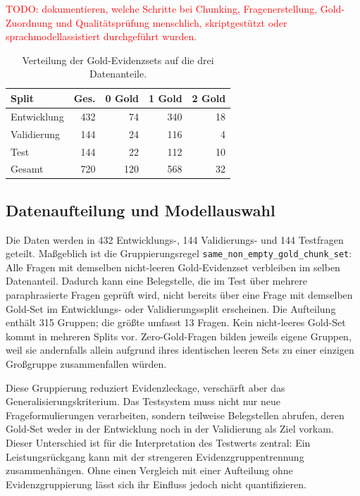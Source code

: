 \documentclass[11pt]{article}
\begin{document}
\textcolor{red}{TODO: dokumentieren, welche Schritte bei Chunking, Fragenerstellung, Gold-Zuordnung und Qualitätsprüfung menschlich, skriptgestützt oder sprachmodellassistiert durchgeführt wurden.}

\begin{table}[t]
\centering
\small
\begin{tabular}{lrrrr}
\toprule
\textbf{Split} & \textbf{Ges.} & \textbf{0 Gold} & \textbf{1 Gold} & \textbf{2 Gold} \\
\midrule
Entwicklung & 432 & 74 & 340 & 18 \\
Validierung & 144 & 24 & 116 & 4 \\
Test         & 144 & 22 & 112 & 10 \\
\midrule
Gesamt       & 720 & 120 & 568 & 32 \\
\bottomrule
\end{tabular}
\caption{Verteilung der Gold-Evidenzsets auf die drei Datenanteile.}
\label{tab:gold-distribution}
\end{table}

\subsection{Datenaufteilung und Modellauswahl}

Die Daten werden in 432 Entwicklungs-, 144 Validierungs- und 144 Testfragen geteilt. Maßgeblich ist die Gruppierungsregel \texttt{same\_non\_empty\_gold\_chunk\_set}: Alle Fragen mit demselben nicht-leeren Gold-Evidenzset verbleiben im selben Datenanteil. Dadurch kann eine Belegstelle, die im Test über mehrere paraphrasierte Fragen geprüft wird, nicht bereits über eine Frage mit demselben Gold-Set im Entwicklungs- oder Validierungssplit erscheinen. Die Aufteilung enthält 315 Gruppen; die größte umfasst 13 Fragen. Kein nicht-leeres Gold-Set kommt in mehreren Splits vor. Zero-Gold-Fragen bilden jeweils eigene Gruppen, weil sie andernfalls allein aufgrund ihres identischen leeren Sets zu einer einzigen Großgruppe zusammenfallen würden.

Diese Gruppierung reduziert Evidenzleckage, verschärft aber das Generalisierungskriterium. Das Testsystem muss nicht nur neue Frageformulierungen verarbeiten, sondern teilweise Belegstellen abrufen, deren Gold-Set weder in der Entwicklung noch in der Validierung als Ziel vorkam. Dieser Unterschied ist für die Interpretation des Testwerts zentral: Ein Leistungsrückgang kann mit der strengeren Evidenzgruppentrennung zusammenhängen. Ohne einen Vergleich mit einer Aufteilung ohne Evidenzgruppierung lässt sich ihr Einfluss jedoch nicht quantifizieren.
\end{document}
